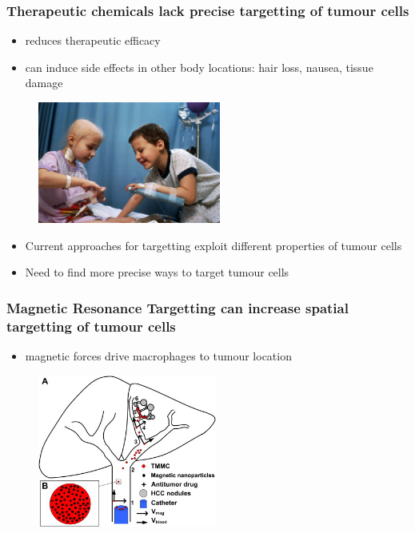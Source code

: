 \documentclass[8pt,xcolor=table]{beamer}
\begin{document}
\begin{frame}
\frametitle{Therapeutic chemicals lack precise targetting of tumour cells}

\begin{itemize}
 \item reduces therapeutic efficacy
 \item can induce side effects in other body locations: hair loss, nausea, tissue damage
\end{itemize}

\begin{figure}
 \centering
\includegraphics[height=4cm]{hair_loss}
\end{figure}

\begin{itemize}
 \item Current approaches for targetting exploit different properties of tumour cells
  \item Need to find more precise ways to target tumour cells
\end{itemize}

\vspace{1em}




\end{frame}

\begin{frame}
\frametitle{Magnetic Resonance Targetting can increase spatial targetting of tumour cells}

\begin{itemize}
 \item magnetic forces drive macrophages to tumour location
\end{itemize}


\begin{figure}
\centering
\includegraphics[height=5cm]{steering}
\end{figure}

 
\end{frame}
\end{document}
